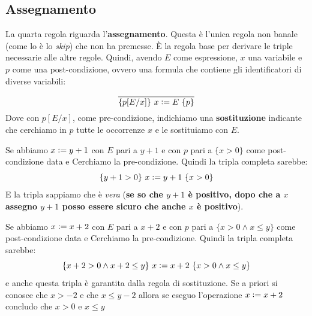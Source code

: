 \subsection{Assegnamento}
\begin{definizione}
	La quarta regola riguarda l'\textbf{assegnamento}. Questa è l'unica regola
	non banale (come lo è lo \textit{skip}) che non ha premesse. È la regola base
	per derivare le triple necessarie alle altre regole. Quindi, avendo $E$ come
	espressione, $x$ una variabile e $p$ come una post-condizione, ovvero una
	formula che contiene gli identificatori di diverse variabili:
	\begin{align}\label{AssignmentRule}
		\frac{}{\{p[E/x]\}\,\, x\cceq E\,\,\{p\}} 
	\end{align}
	Dove con $p[E/x]$, come pre-condizione, indichiamo una \textbf{sostituzione} 
	indicante che cerchiamo in $p$ tutte le occorrenze $x$ e le sostituiamo con $E$.
	\begin{esempio}
		Se abbiamo $x \cceq y+1$ con $E$ pari a $y+1$ e con $p$ pari a $\{x>0\}$ come
		post-condizione data e Cerchiamo la pre-condizione. Quindi la tripla completa
		sarebbe: 
		\[\{y+1>0\}\,\, x \cceq y+1\,\,\{x>0\}\]
		E la tripla sappiamo che è \emph{vera} (\textbf{se so che $y+1$ è positivo, dopo
		che a $x$ assegno $y+1$ posso essere sicuro che anche $x$ è positivo}).
	\end{esempio}
	\begin{esempio}
		Se abbiamo $x \cceq x+2$ con $E$ pari a $x+2$ e con $p$ pari a $\{x>0\land x\leq
		y\}$ come post-condizione data e Cerchiamo la pre-condizione. Quindi la tripla
		completa sarebbe:
		\[\{x+2>0\land x+2\leq y\}\,\, x \cceq x+2\,\,\{x>0\land x\leq y\}\]
		e anche questa tripla è garantita dalla regola di sostituzione.
		Se a priori si conosce che $x>-2$ e che $x \leq y-2$ allora se eseguo l'operazione $x \cceq x+2$ concludo che $x>0$ e $x \leq y$
	\end{esempio}
\end{definizione} \vspace{5mm} %
